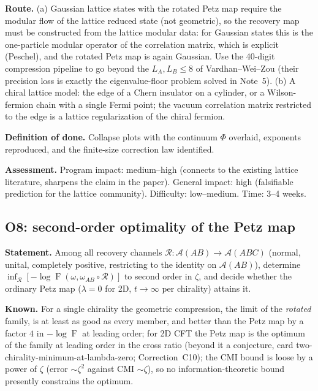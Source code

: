 \documentclass[11pt]{article}
\theoremstyle{accent}
\theoremstyle{definition}
\newcommand{\cA}{\mathcal{A}}
\newcommand{\cR}{\mathcal{R}}
\newcommand{\Fid}{\operatorname{F}}
\begin{document}
\textbf{Route.} (a) Gaussian lattice states with the rotated Petz map require the modular flow of the lattice reduced state (not geometric), so the recovery map must be constructed from the lattice modular data: for Gaussian states this is the one-particle modular operator of the correlation matrix, which is explicit (Peschel), and the rotated Petz map is again Gaussian.  Use the 40-digit compression pipeline to go beyond the \(L_A,L_B\le8\) of Vardhan--Wei--Zou (their precision loss is exactly the eigenvalue-floor problem solved in Note~5).  (b) A chiral lattice model: the edge of a Chern insulator on a cylinder, or a Wilson-fermion chain with a single Fermi point; the vacuum correlation matrix restricted to the edge is a lattice regularization of the chiral fermion.

\textbf{Definition of done.} Collapse plots with the continuum \(\Phi\) overlaid, exponents reproduced, and the finite-size correction law identified.

\textbf{Assessment.} Program impact: medium--high (connects to the existing lattice literature, sharpens the claim in the paper).  General impact: high (falsifiable prediction for the lattice community).  Difficulty: low--medium.  Time: 3--4 weeks.

\subsection{O8: second-order optimality of the Petz map}\label{sec:O8}
\textbf{Statement.} Among all recovery channels \(\cR:\cA(AB)\to\cA(ABC)\) (normal, unital, completely positive, restricting to the identity on \(\cA(AB)\)), determine \(\inf_{\cR}[-\log\Fid(\omega,\omega_{AB}\circ\cR)]\) to second order in \(\zeta\), and decide whether the ordinary Petz map (\(\lambda=0\) for 2D, \(t\to\infty\) per chirality) attains it.

\textbf{Known.} For a single chirality the geometric compression, the limit of the \emph{rotated} family, is at least as good as every member, and better than the Petz map by a factor \(4\) in \(-\log\Fid\) at leading order; for 2D CFT the Petz map is the optimum of the family at leading order in the cross ratio (beyond it a conjecture, card two-chirality-minimum-at-lambda-zero; Correction~C10); the CMI bound is loose by a power of \(\zeta\) (error \(\sim\zeta^2\) against CMI \(\sim\zeta\)), so no information-theoretic bound presently constrains the optimum.
\end{document}
